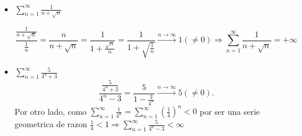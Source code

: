 \begin{example}
	~\begin{itemize}
		\item \(\sum_{n =1}^{\infty} \frac{1}{n + \sqrt{n } }\)
		      
		      \[
			      \frac{\frac{1 }{n + \sqrt{n } }}{\frac{1}{n }} = \frac{n }{n + \sqrt{n } } = \frac{1}{1 + \frac{\sqrt{n } }{n }} = \frac{1}{1 + \sqrt{\frac{1}{n }} } \overset{n\rightarrow \infty}{\longrightarrow} 1 (\neq 0) \Rightarrow \sum_{n =1}^{\infty} \frac{1}{n+\sqrt{n} } = + \infty
		      \]
		\item \(\sum_{n =1}^{\infty} \frac{5}{4^{n} + 3 }\)
		      \[
			      \frac{\frac{5}{4^{n} + 3 }}{4^{n} -3 } = \frac{5}{1 - \frac{3}{4^{n} }} \overset{n\rightarrow \infty}{\longrightarrow} 5 (\neq 0).
		      \]
		      Por otro lado, como \(\sum_{n =1}^{\infty} \frac{1}{4^{n} } = \sum_{n =1}^{\infty} \left (\frac{1}{4} \right)^{n} < 0\) por ser una serie geometrica de razon \(\frac{1}{4} < 1 \Rightarrow \sum_{n =1}^{\infty} \frac{5}{4^{n} - 3 } < \infty\)
	\end{itemize}
\end{example}
